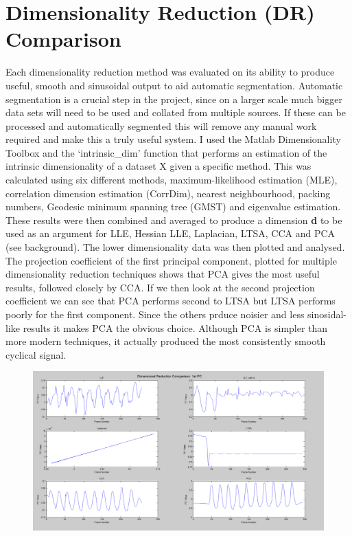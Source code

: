 \section {Dimensionality Reduction (DR) Comparison}
Each dimensionality reduction method was evaluated on its ability to produce useful, smooth and sinusoidal output to aid automatic segmentation. Automatic segmentation is a crucial step in the project, since on a larger scale much bigger data sets will need to be used and collated from multiple sources. If these can be processed and automatically segmented this will remove any manual work required and make this a truly useful system. I used the Matlab Dimensionality Toolbox and the `intrinsic_dim' function that performs an estimation of the intrinsic dimensionality of a dataset X given a specific method. This was calculated using six different methods, maximum-likelihood estimation (MLE), correlation dimension estimation (CorrDim), nearest neighbourhood, packing numbers, Geodesic minimum spanning tree (GMST) and eigenvalue estimation.
These results were then combined and averaged to produce a dimension {\bf d} to be used as an argument for LLE, Hessian LLE, Laplacian, LTSA, CCA and PCA (see background). The lower dimensionality data was then plotted and analysed.
The projection coefficient of the first principal component, plotted for multiple dimensionality reduction techniques shows that PCA gives the most useful results, followed closely by CCA. If we then look at the second projection coefficient we can see that PCA performs second to LTSA but LTSA performs poorly for the first component. Since the others prduce noisier and less sinosidal-like results it makes PCA the obvious choice. Although PCA is simpler than more modern techniques, it actually produced the most consistently smooth cyclical signal.
\begin{figure}[h!]
    \centering
    \includegraphics[height=0.25\textheight]{fig04/drcomp.pdf}
    \label{fig:drcomp}
\end{figure}
